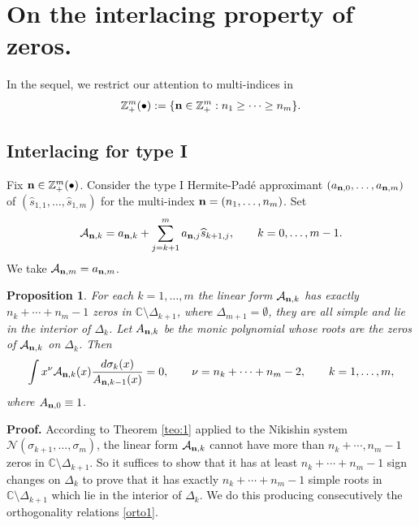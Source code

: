 \documentclass{amsart}
\newtheorem{pro}{\sc Proposition}[section]
\theoremstyle{definition}
\theoremstyle{remark}
\begin{document}
\medskip

\section{On the interlacing property of zeros.}

In the sequel, we restrict our attention to multi-indices in
\[  {\mathbb{Z}}_+^{m}(\bullet) := \{{\bf n} \in {\mathbb{Z}}_+^{m}:  n_1 \geq \cdots \geq n_m\}.
\]

\subsection{Interlacing for type I}
Fix ${\bf n} \in {\mathbb{Z}}_+^{m}(\bullet)$. Consider the type I Hermite-Pad\'e approximant $(a_{{\bf n},0},\ldots,a_{{\bf n},m})$ of $(\widehat{s}_{1,1},\ldots,\widehat{s}_{1,m})$ for the  multi-index  ${\bf n}= (n_1,\ldots,n_m)$. Set
\[ {\mathcal{A}}_{{\bf n},k} = a_{{\bf n},k} + \sum_{j=k+1}^m a_{{\bf n},j} \widehat{s}_{k+1,j}, \qquad k=0,\ldots,m-1.
\]
We take ${\mathcal{A}}_{{\bf n},m} = a_{{\bf n},m} $.

\begin{pro} \label{teo:3} For each $k=1,\ldots,m$ the linear form ${\mathcal{A}}_{{\bf n},k}$ has exactly $n_k + \cdots +n_m -1$ zeros in ${\mathbb{C}} \setminus \Delta_{k+1}$, where $\Delta_{m+1}= \emptyset$, they are all simple and lie in the interior of $\Delta_k$. Let $A_{{\bf n},k}$ be the monic polynomial whose roots are the zeros  of ${\mathcal{A}}_{{\bf n},k}$ on $\Delta_k$. Then
\begin{equation} \label{orto1}
\int x^\nu {\mathcal{A}}_{{\bf n},k}(x) \frac{d \sigma_k (x)}{A_{{\bf n},k-1}(x)} = 0, \qquad \nu =  n_k+\cdots+n_m -2, \qquad k=1,\ldots,m,
\end{equation}
where $A_{{\bf n},0} \equiv 1$.
\end{pro}

{\bf Proof.} According to Theorem \ref{teo:1} applied to the Nikishin system ${\mathcal{N}}(\sigma_{k+1},\ldots,\sigma_m)$, the linear form ${\mathcal{A}}_{{\bf n},k}$ cannot have more than $n_k +\cdots,n_m -1$ zeros in ${\mathbb{C}} \setminus \Delta_{k+1}$. So it suffices to show that it has at least $n_k + \cdots + n_m -1$ sign changes on $\Delta_k$ to prove that it has exactly $n_k + \cdots + n_m -1$ simple roots in ${\mathbb{C}} \setminus \Delta_{k+1}$ which lie in the interior of $\Delta_k$. We do this producing consecutively the orthogonality relations \eqref{orto1}.
\end{document}
